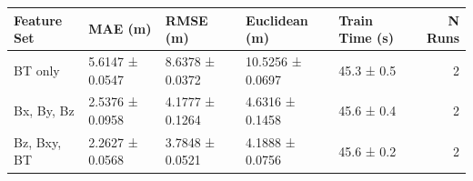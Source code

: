\begin{tabular}{lllllr}
\toprule
Feature Set & MAE (m) & RMSE (m) & Euclidean (m) & Train Time (s) & N Runs \\
\midrule
BT only & 5.6147 ± 0.0547 & 8.6378 ± 0.0372 & 10.5256 ± 0.0697 & 45.3 ± 0.5 & 2 \\
Bx, By, Bz & 2.5376 ± 0.0958 & 4.1777 ± 0.1264 & 4.6316 ± 0.1458 & 45.6 ± 0.4 & 2 \\
Bz, Bxy, BT & 2.2627 ± 0.0568 & 3.7848 ± 0.0521 & 4.1888 ± 0.0756 & 45.6 ± 0.2 & 2 \\
\bottomrule
\end{tabular}
